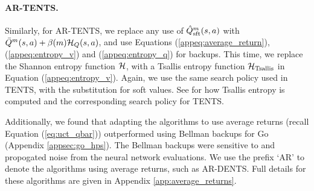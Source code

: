     \paragraph{AR-TENTS.} Similarly, for AR-TENTS, we replace any use of $\hat{Q}^m_{\textnormal{sft}}(s,a)$ with $\bar{Q}^m(s,a)+\beta(m)\mathcal{H}_Q(s,a)$, and use Equations (\ref{appeq:average_return}), (\ref{appeq:entropy_v}) and (\ref{appeq:entropy_q}) for backups. This time, we replace the Shannon entropy function $\mathcal{H}$, with a Tsallis entropy function $\mathcal{H}_{\textnormal{Tsallis}}$ in Equation (\ref{appeq:entropy_v}). Again, we use the same search policy used in TENTS, with the substitution for soft values. See %
        for how Tsallis entropy is computed and the corresponding search policy for TENTS. 


    Additionally, we found that adapting the algorithms to use average returns (recall Equation (\ref{eq:uct_qbar})) outperformed using Bellman backups for Go (Appendix \ref{appsec:go_hps}). The Bellman backups were sensitive to and propogated noise from the neural network evaluations. We use the prefix `AR' to denote the algorithms using average returns, such as AR-DENTS. Full details for these algorithms are given in Appendix \ref{app:average_returns}.

